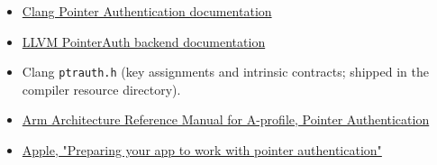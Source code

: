 \begin{itemize}
\item \href{https://clang.llvm.org/docs/PointerAuthentication.html}{Clang Pointer Authentication documentation}
\item \href{https://llvm.org/docs/PointerAuth.html}{LLVM PointerAuth backend documentation}
\item Clang \texttt{ptrauth.h} (key assignments and intrinsic contracts; shipped in the compiler resource directory).
\item \href{https://developer.arm.com/documentation/ddi0487/latest}{Arm Architecture Reference Manual for A-profile, Pointer Authentication}
\item \href{https://developer.apple.com/documentation/security/preparing-your-app-to-work-with-pointer-authentication}{Apple, "Preparing your app to work with pointer authentication"}
\end{itemize}


